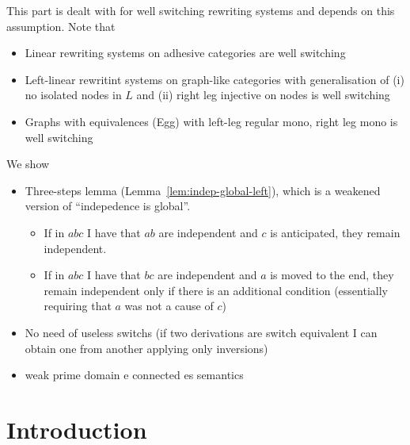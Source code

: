 \documentclass[a4paper,UKenglish,cleveref,pdftex,thm-restate,numberwithinsect,anonymous]{lipics}
\begin{document}
This part is dealt with for well switching rewriting systems and depends on this assumption. Note that
\begin{itemize}
\item Linear rewriting systems on adhesive categories are well switching
\item Left-linear rewritint systems on graph-like categories with generalisation of (i) no isolated nodes in $L$ and (ii) right leg injective on nodes is well switching
\item Graphs with equivalences (Egg) with left-leg regular mono, right leg mono is well switching
\end{itemize}

We show
\begin{itemize}
  

\item Three-steps lemma (Lemma~\ref{lem:indep-global-left}), which is a weakened version of ``indepedence is global''.
  \begin{itemize}
    
  \item If in $abc$ I have that $ab$ are independent and $c$ is anticipated, they remain independent.
  \item  If in $abc$ I have that $bc$ are independent and $a$ is moved to the end, they remain independent only if there is an additional condition (essentially requiring that $a$ was not a cause of $c$)
  \end{itemize}

  
  
\item No need of useless switchs (if two derivations are switch equivalent I can obtain one from another applying only inversions)
  
\item weak prime domain e connected es semantics
\end{itemize}
\fi

\section{Introduction}

%
\end{document}
